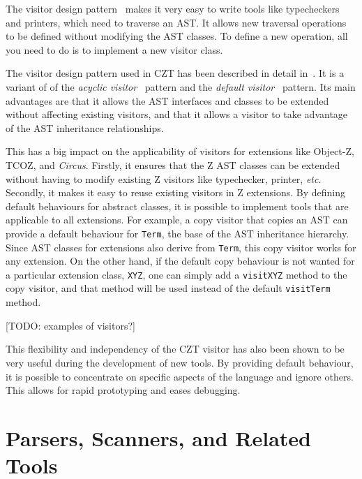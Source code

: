 \documentclass{llncs}
\newcommand{\Circus}{{\sf\slshape Circus}}
\newcommand{\Interface}[1]{\texttt{#1}}
\begin{document}
  The visitor design pattern~\cite{GamEA:95,MaiCha:01} makes it very
  easy to write tools like typecheckers and printers, which need to
  traverse an AST.  It allows new traversal operations to be defined 
  without modifying the AST classes.  To define a new operation, all 
  you need to do is to implement a new visitor class.

  The visitor design pattern used in CZT has been described in detail
  in~\cite{czt}.  It is a variant of of the \emph{acyclic
  visitor}~\cite{Mar:97} pattern and the \emph{default
  visitor}~\cite{Nor:97} pattern.  Its main advantages are that it
  allows the AST interfaces and classes to be extended without
  affecting existing visitors, and that it allows a visitor to take
  advantage of the AST inheritance relationships.

  This has a big impact on the applicability of visitors for
  extensions like Object-Z, TCOZ, and \Circus.  Firstly, it ensures
  that the Z AST classes can be extended without having to modify
  existing Z visitors like typechecker, printer,
  \textit{etc}. Secondly, it makes it easy to reuse existing visitors
  in Z extensions.  By defining default behaviours for abstract
  classes, it is possible to implement tools that are applicable to
  all extensions.  For example, a copy visitor that copies an AST can
  provide a default behaviour for \Interface{Term}, the base of the
  AST inheritance hierarchy.  Since AST classes for extensions also
  derive from \Interface{Term}, this copy visitor works for any
  extension.  On the other hand, if the default copy behaviour is not
  wanted for a particular extension class, \texttt{XYZ}, one can
  simply add a \texttt{visitXYZ} method to the copy visitor, and that
  method will be used instead of the default \texttt{visitTerm}
  method.

  [TODO: examples of visitors?]

  This flexibility and independency of the CZT visitor has also been
  shown to be very useful during the development of new tools.  By
  providing default behaviour, it is possible to concentrate on
  specific aspects of the language and ignore others.  This allows for
  rapid prototyping and eases debugging.

\section{Parsers, Scanners, and Related Tools}
\label{parsers}
\end{document}

